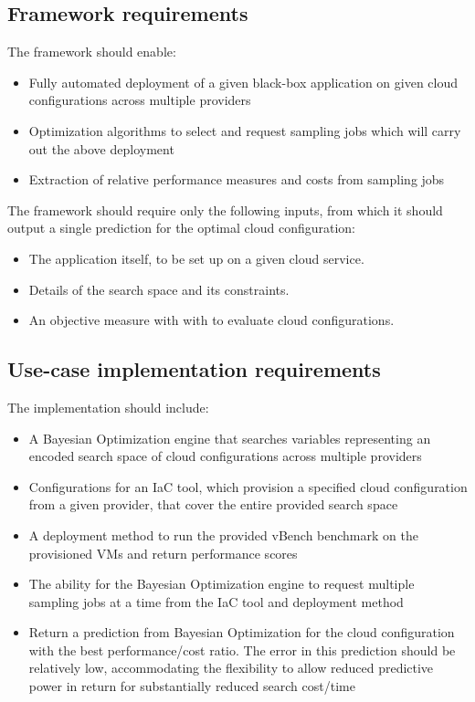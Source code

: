 \documentclass{report}
\begin{document}
\subsection{Framework requirements}
The framework should enable:
\begin{itemize}
\item Fully automated deployment of a given black-box application on given cloud configurations across multiple providers
\item Optimization algorithms to select and request sampling jobs which will carry out the above deployment
\item Extraction of relative performance measures and costs from sampling jobs
\end{itemize}
The framework should require only the following inputs, from which it should output a single prediction for the optimal cloud configuration:
\begin{itemize}
\item The application itself, to be set up on a given cloud service.
\item Details of the search space and its constraints.
\item An objective measure with with to evaluate cloud configurations.
\end{itemize}

\subsection{Use-case implementation requirements}
The implementation should include:
\begin{itemize}
\item A Bayesian Optimization engine that searches variables representing an encoded search space of cloud configurations across multiple providers
\item Configurations for an IaC tool, which provision a specified cloud configuration from a given provider, that cover the entire provided search space
\item A deployment method to run the provided vBench benchmark on the provisioned VMs and return performance scores
\item The ability for the Bayesian Optimization engine to request multiple sampling jobs at a time from the IaC tool and deployment method
\item Return a prediction from Bayesian Optimization for the cloud configuration with the best performance/cost ratio. The error in this prediction should be relatively low, accommodating the flexibility to allow reduced predictive power in return for substantially reduced search cost/time
\end{itemize}
\end{document}

